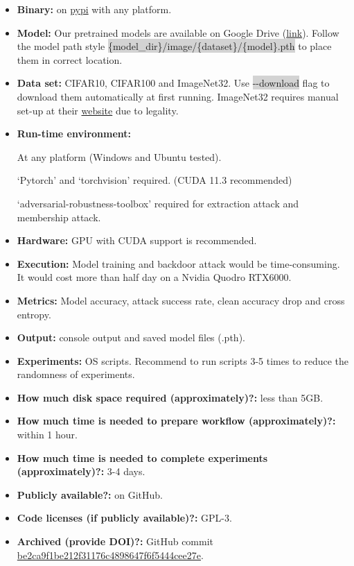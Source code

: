 \documentclass[letterpaper,twocolumn,10pt]{article}
\begin{document}
{\small
\begin{itemize}
    \item {\bf Binary: }on \href{https://pypi.org/project/autovul/}{pypi} with any platform.
    \item {\bf Model: }Our pretrained models are available on Google Drive (\href{https://drive.google.com/drive/folders/1GrjEO89hYrdLhDMkBLC26jp1C7BwIKwm?usp=sharing}{link}). Follow the model path style \colorbox{lightgray}{\{model\_dir\}/image/\{dataset\}/\{model\}.pth} to place them in correct location.
    \item {\bf Data set: }CIFAR10, CIFAR100 and ImageNet32. Use \colorbox{lightgray}{-{}-download} flag to download them automatically at first running. ImageNet32 requires manual set-up at their \href{https://image-net.org/download-images.php}{website} due to legality.
    \item {\bf Run-time environment: }

          At any platform (Windows and Ubuntu tested).

          `Pytorch' and `torchvision' required. (CUDA 11.3 recommended)

          `adversarial-robustness-toolbox' required for extraction attack and membership attack.
    \item {\bf Hardware: }GPU with CUDA support is recommended.
    \item {\bf Execution: }Model training and backdoor attack would be time-consuming. It would cost more than half day on a Nvidia Quodro RTX6000.
    \item {\bf Metrics: }Model accuracy, attack success rate, clean accuracy drop and cross entropy.
    \item {\bf Output: }console output and saved model files (.pth).
    \item {\bf Experiments: }OS scripts. Recommend to run scripts 3-5 times to reduce the randomness of experiments.
    \item {\bf How much disk space required (approximately)?: }less than 5GB.
    \item {\bf How much time is needed to prepare workflow (approximately)?: }within 1 hour.
    \item {\bf How much time is needed to complete experiments (approximately)?: }3-4 days.
    \item {\bf Publicly available?: }on GitHub.
    \item {\bf Code licenses (if publicly available)?: }GPL-3.
    \item {\bf Archived (provide DOI)?: }GitHub commit \href{https://github.com/ain-soph/autovul/tree/5aeb0d8ad7ed7f2c58fc960694af81b118608b9b}{be2ca9f1be212f31176c4898647f6f5444cee27e}.
\end{itemize}

}
\end{document}
